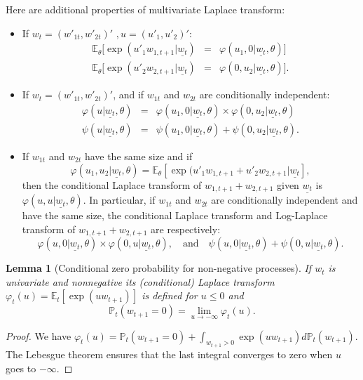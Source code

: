 \documentclass[
  12pt,
]{book}
\newtheorem{lemma}{Lemma}[chapter]
\theoremstyle{definition}
\theoremstyle{definition}
\theoremstyle{definition}
\theoremstyle{definition}
\theoremstyle{remark}
\begin{document}
Here are additional properties of multivariate Laplace transform:

\begin{itemize}
\item
  If \(w_t=(w'_{1t},w'_{2t})'\) \(, u=(u'_1, u'_2)'\):
  \begin{eqnarray*}
  \mathbb{E}_{\theta}[\exp(u'_1 w_{1,t+1}|\underline{w_t})&=&\varphi(u_1,0|\underline{w_t},\theta)] \\
  \mathbb{E}_{\theta}[\exp(u'_2 w
  _{2,t+1}|\underline{w_t})&=&\varphi(0,u_2|\underline{w_t},\theta)].
  \end{eqnarray*}
\item
  If \(w_t=(w'_{1t},w'_{2t})'\), and if \(w_{1t}\) and \(w_{2t}\) are conditionally independent:
  \begin{eqnarray*}
  \varphi(u|\underline{w_t},\theta) &=&
  \varphi(u_1,0|\underline{w_t},\theta)\times\varphi(0,u_2|\underline{w_t},\theta) \\
  \psi(u|\underline{w_t},\theta) &=&
  \psi(u_1,0|\underline{w_t},\theta)+\psi(0,u_2|\underline{w_t},\theta).
  \end{eqnarray*}
\item
  If \(w_{1t}\) and \(w_{2t}\) have the same size and if
  \[
  \varphi(u_1, u_2|\underline{w_t},\theta) = \mathbb{E}_\theta[\exp(u'_1 w_{1, t+1} + u'_2 w_{2,t+1}|\underline{w_t}],
  \]
  then the conditional Laplace transform of \(w_{1, t+1} + w_{2, t+1}\) given
  \(\underline{w_t}\) is \(\varphi(u, u|\underline{w_t},\theta)\).
  In particular, if \(w_{1t}\) and \(w_{2t}\) are conditionally independent and
  have the same size, the conditional Laplace transform and Log-Laplace
  transform of \(w_{1,t+1}+w_{2,t+1}\) are respectively:
  \[
  \varphi(u,0|\underline{w_t},\theta)\times \varphi(0,
  u|\underline{w_t},\theta), \quad \mbox{and}\quad \psi(u,0|\underline{w_t},\theta)+ \psi(0,
  u|\underline{w_t},\theta).
  \]
\end{itemize}

\begin{lemma}[Conditional zero probability for non-negative processes]
\protect\hypertarget{lem:lemMass}{}\label{lem:lemMass}If \(w_t\) is univariate and nonnegative its (conditional)
Laplace transform \(\varphi_t(u) = \mathbb{E}_t[\exp(u w_{t+1})]\) is defined
for \(u \leq 0\) and
\[
\mathbb{P}_t(w_{t+1} = 0) = \lim_{u\rightarrow - \infty} \varphi_t(u).
\]
\end{lemma}

\begin{proof}
We have \(\varphi_t(u) = \mathbb{P}_t(w_{t+1} = 0) + \int_{w_{t+1}> 0} \exp(u w_{t+1}) d\mathbb{P}_t(w_{t+1})\). The Lebesgue theorem ensures that the last integral converges to zero when \(u\) goes to \(-\infty\).
\end{proof}
\end{document}

